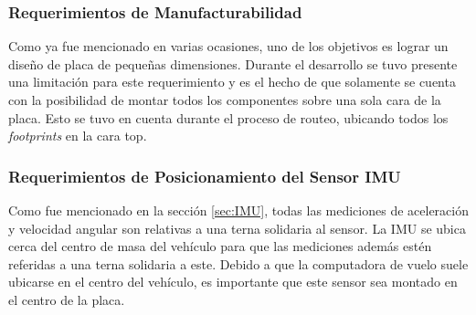 
\subsubsection{Requerimientos de Manufacturabilidad}\label{sec:requerimientos_manufacturabilidad}

Como ya fue mencionado en varias ocasiones, uno de los objetivos es lograr un diseño de placa de pequeñas dimensiones. %
Durante el desarrollo se tuvo presente una limitación para este requerimiento y es el hecho de que solamente se cuenta con la posibilidad de montar todos los componentes sobre una sola cara de la placa. Esto se tuvo en cuenta durante el proceso de routeo, ubicando todos los \textit{footprints} en la cara top.







\subsubsection{Requerimientos de Posicionamiento del Sensor IMU}

Como fue mencionado en la sección \ref{sec:IMU}, todas las mediciones de aceleración y velocidad angular son relativas a una terna solidaria al sensor. La IMU se ubica cerca del centro de masa del vehículo para que las mediciones además estén referidas a una terna solidaria a este. Debido a que la computadora de vuelo suele ubicarse en el centro del vehículo, es importante que este sensor sea montado en el centro de la placa.



